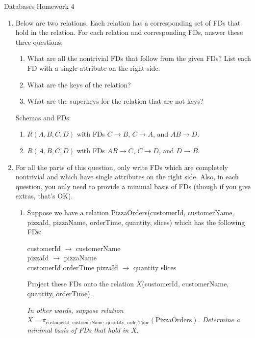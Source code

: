 \documentclass[11pt]{article}
\begin{document}
{\Large{\noindent Databases Homework 4}}

\begin{enumerate}
	\item Below are two relations.  Each relation has a corresponding set of FDs that
	hold in the relation.
	For each relation and corresponding  FDs, answer these three questions:
	
	\begin{enumerate}[label=(\roman*)]
		\item What are all the nontrivial FDs that follow from the given FDs?  List each FD with
		a single attribute on the right side.
		\item What are the keys of the relation?
		\item What are the superkeys for the relation that are not keys?
	\end{enumerate}
	
	Schemas and FDs:
	
	\begin{enumerate}
		\item $R(A, B, C, D)$ with FDs $C \to B$, $C \to A$, and $AB \to D$.
		\item $R(A, B, C, D)$ with FDs $AB \to C$, $C \to D$, and $D \to B$.

	\end{enumerate}
	
	\item For all the parts of this question, only write FDs which are completely nontrivial and which have single
	attributes on the right side.  Also, in each question, you only need to provide a minimal basis of FDs (though if you
	give extras, that's OK).
	
	\begin{enumerate}
		\item Suppose we have a relation PizzaOrders(customerId, customerName, pizzaId, pizzaName, orderTime, quantity, 
		slices) which has the following FDs:
		
		customerId $\to$ customerName \\
		pizzaId $\to$ pizzaName \\
		customerId orderTime pizzaId  $\to$ quantity slices
		
		Project these FDs onto the relation $X$(customerId, customerName, quantity, orderTime).
		
		\emph{In other words, suppose relation $X = \pi_\text{customerId, customerName, quantity, orderTime}(\text{PizzaOrders})$. 
		Determine a minimal basis of FDs that hold in $X$}.
		

\end{enumerate}
\end{enumerate}
\end{document}
